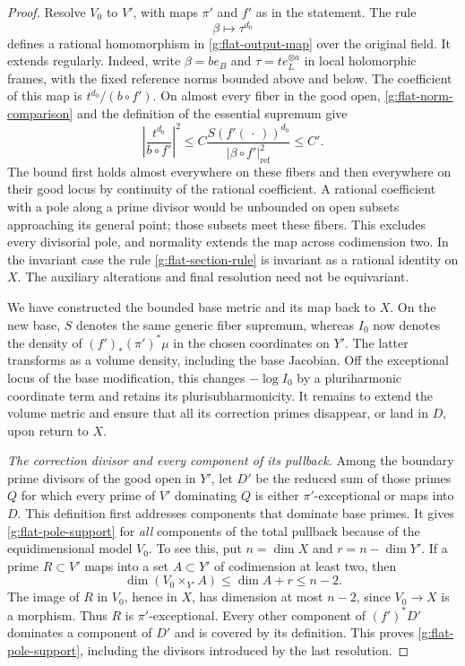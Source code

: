 \begin{proof}
Resolve \(V_0\) to \(V'\), with maps \(\pi'\) and \(f'\) as in the
statement.  The rule
\begin{equation}
                          \beta\longmapsto\tau^{d_0}
 \label{g:flat-section-rule}
\end{equation}
defines a rational homomorphism in \eqref{g:flat-output-map} over the
original field. It extends regularly. Indeed, write
\(\beta=b e_B\) and \(\tau=t e_L^{\otimes a}\) in local holomorphic
frames, with the fixed reference norms bounded above and below. The
coefficient of this map is \(t^{d_0}/(b\circ f')\). On almost every
fiber in the good open, \eqref{g:flat-norm-comparison} and the definition
of the essential supremum give
\[
 \left|\frac{t^{d_0}}{b\circ f'}\right|^2
 \leq C\frac{S(f'(\,\cdot\,))^{d_0}}
                  {|\beta\circ f'|_{\mathrm{ref}}^2}
 \leq C'.
\]
The bound first holds almost everywhere on these fibers and then
everywhere on their good locus by continuity of the rational coefficient.
A rational coefficient with a pole along a prime divisor would be
unbounded on open subsets approaching its general point; those subsets
meet these fibers.  This excludes every divisorial pole, and normality
extends the map across codimension two.  In the invariant case the rule
\eqref{g:flat-section-rule} is invariant as a rational identity on \(X\).
The auxiliary alterations and final resolution need not be equivariant.

We have constructed the bounded base metric and its map back to \(X\).
On the new base, \(S\) denotes the same generic fiber supremum, whereas
\(I_0\) now denotes the density of \((f')_*(\pi')^*\mu\) in the chosen
coordinates on \(Y'\).  The latter transforms as a volume density,
including the base Jacobian.  Off the exceptional locus of the base
modification, this changes \(-\log I_0\) by a pluriharmonic coordinate
term and retains its plurisubharmonicity.
It remains to extend the volume metric and ensure that all its correction
primes disappear, or land in \(D\), upon return to \(X\).

\emph{The correction divisor and every component of its pullback.}
Among the boundary prime divisors of the good open in \(Y'\), let \(D'\)
be the reduced sum of those primes \(Q\) for which every prime of
\(V'\) dominating \(Q\) is either \(\pi'\)-exceptional or maps into
\(D\).  This definition first addresses components that dominate base
primes.  It gives \eqref{g:flat-pole-support} for \emph{all} components
of the total pullback because of the equidimensional model \(V_0\).
To see this, put \(n=\dim X\) and \(r=n-\dim Y'\).  If a prime
\(R\subset V'\) maps into a set \(A\subset Y'\) of codimension at
least two, then
\[
       \dim(V_0\times_{Y'}A)\le\dim A+r\le n-2.
\]
The image of \(R\) in \(V_0\), hence in \(X\), has dimension at most
\(n-2\), since \(V_0\to X\) is a morphism.  Thus \(R\) is
\(\pi'\)-exceptional.  Every other component of \((f')^*D'\) dominates
a component of \(D'\) and is covered by its definition.  This proves
\eqref{g:flat-pole-support}, including the divisors introduced by the
last resolution.


\end{proof}
